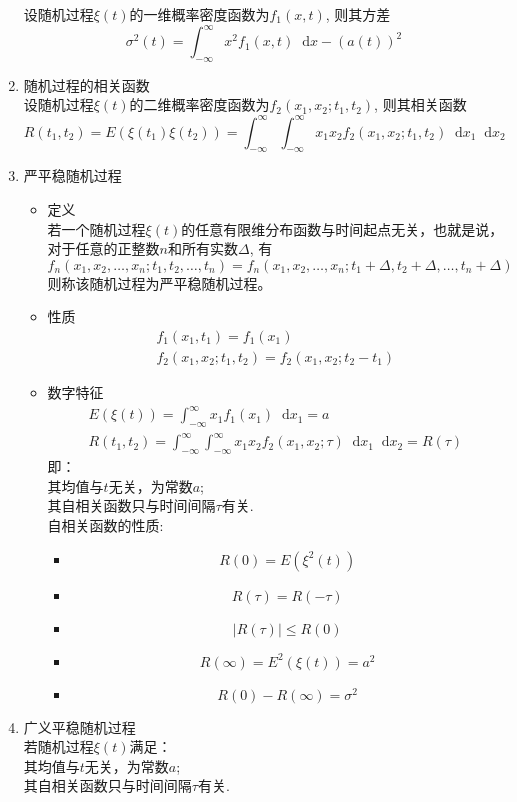 \documentclass[UTF8]{ctexrep}
\newcommand{\dif}{\mathop{}\!{}\mathrm{d}}
\def\pth#1{\left( {#1}\right)}
\begin{document}
\begin{enumerate}
设随机过程$\xi(t)$的一维概率密度函数为$f_1(x, t)$, 则其方差
\[\sigma ^2(t)=\int_{-\infty}^{\infty}x^2f_1(x, t)\dif x-\pth{a(t)}^2\]
\item 随机过程的相关函数\\
设随机过程$\xi(t)$的二维概率密度函数为$f_2(x_1, x_2; t_1, t_2)$, 则其相关函数
\[R(t_1, t_2)=E\pth{\xi(t_1)\xi(t_2)}=\int_{-\infty}^{\infty}\int_{-\infty}^{\infty}x_1x_2f_2(x_1, x_2;t_1, t_2)\dif x_1\dif x_2\]
\item 严平稳随机过程
\begin{itemize}
\item 定义\\
若一个随机过程$\xi(t)$的任意有限维分布函数与时间起点无关，也就是说，对于任意的正整数$n$和所有实数$\Delta$, 有
\[f_n(x_1, x_2,\ldots, x_n;t_1, t_2,\ldots ,t_n)=f_n(x_1, x_2,\ldots, x_n;t_1+\Delta, t_2+\Delta,\ldots ,t_n+\Delta)\]
则称该随机过程为严平稳随机过程。
\item 性质
\begin{gather*}
f_1(x_1, t_1)=f_1(x_1)\\
f_2(x_1, x_2; t_1, t_2)=f_2(x_1, x_2; t_2-t_1)
\end{gather*}
\item 数字特征
\begin{gather*}
E\pth{\xi(t)}=\int_{-\infty}^{\infty}x_1f_1(x_1)\dif x_1=a\\
R(t_1, t_2)=\int_{-\infty}^{\infty}\int_{-\infty}^{\infty}x_1x_2f_2(x_1, x_2;\tau)\dif x_1\dif x_2=R(\tau)
\end{gather*}
即：\\
其均值与$t$无关，为常数$a$;\\
其自相关函数只与时间间隔$\tau$有关.\\
自相关函数的性质:
\begin{itemize}
\item \[R(0)=E\pth{\xi^2(t)}\]
\item \[R(\tau)=R(-\tau)\]
\item \[|R(\tau)|\leq R(0)\]
\item \[R(\infty)=E^2(\xi(t))=a^2\]
\item \[R(0)-R(\infty)=\sigma ^2\]
\end{itemize}
\end{itemize}
\item 广义平稳随机过程\\
若随机过程$\xi(t)$满足：\\
其均值与$t$无关，为常数$a$;\\
其自相关函数只与时间间隔$\tau$有关.\\

\end{enumerate}
\end{document}
